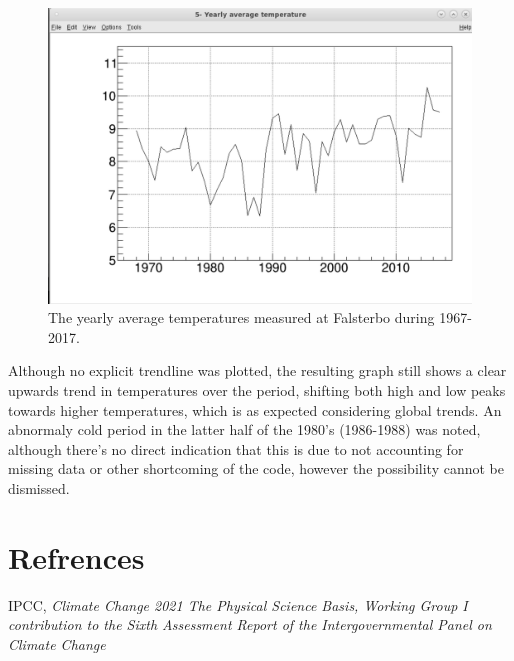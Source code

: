 \begin{figure}[H]
    \centering
    \includegraphics[scale=0.65]{Graph5c.PNG}
    \caption{The yearly average temperatures measured at Falsterbo during 1967-2017.}
    \label{dipole}
\end{figure}

Although no explicit trendline was plotted, the resulting graph still shows a clear upwards trend in temperatures over the period, shifting both high and low peaks towards higher temperatures, which is as expected considering global trends. An abnormaly cold period in the latter half of the 1980's (1986-1988) was noted, although there's no direct indication that this is due to not accounting for missing data or other shortcoming of the code, however the possibility cannot be dismissed.


\section{Refrences}
\begin{thebibliography}{}

 IPCC, \textit{Climate Change 2021 The Physical Science Basis, Working Group I contribution to the Sixth Assessment Report of the Intergovernmental Panel on Climate Change}

\end{thebibliography}